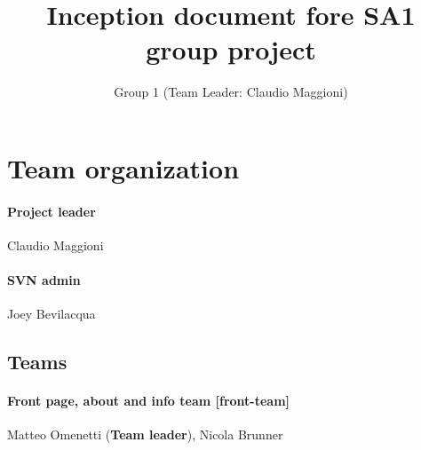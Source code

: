 \documentclass[hidelinks,12pt,a4paper,numbers=enddot]{scrartcl}
\title{Inception document fore SA1 group project}
\author{Group 1 (Team Leader: Claudio Maggioni)}
\begin{document}
\maketitle
\tableofcontents
\newpage

\section{Team organization}\label{team-organization}

\paragraph{Project leader}
Claudio Maggioni

\paragraph{SVN admin}
Joey Bevilacqua

\subsection{Teams}

\paragraph{Front page, about and info team {[}front-team{]}}
Matteo Omenetti (\textbf{Team leader}), Nicola Brunner
\end{document}
